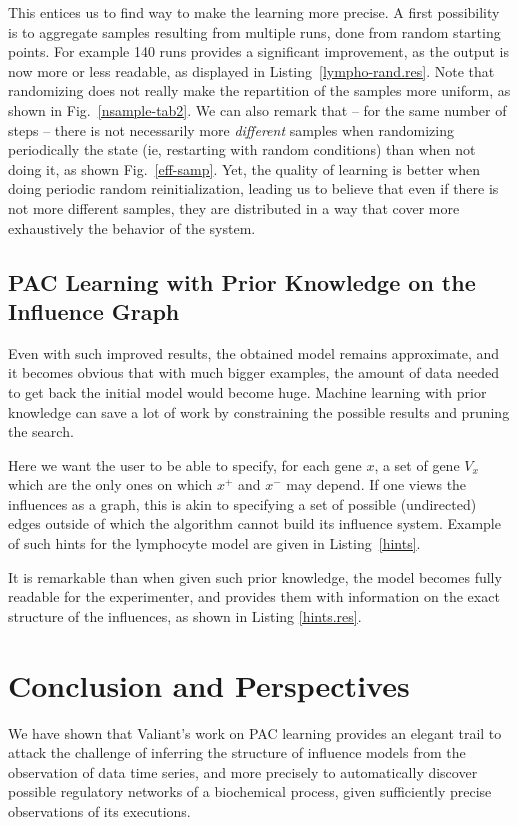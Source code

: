\documentclass{llncs}
\begin{document}
This entices us to find way to make the learning more precise. A first possibility is to aggregate samples resulting from multiple runs, done from random starting points. For example 140 runs provides a significant improvement, as the output is now more or less readable, as displayed in Listing~\ref{lympho-rand.res}. Note that randomizing does not really make the repartition of the samples more uniform, as shown in Fig.~\ref{nsample-tab2}. We can also remark that -- for the same number of steps -- there is not necessarily more \emph{different} samples when randomizing periodically the state (ie, restarting with random conditions) than when not doing it, as shown Fig.~\ref{eff-samp}. Yet, the quality of learning is better when doing periodic random reinitialization, leading us to believe that even if there is not more different samples, they are distributed in a way that cover more exhaustively the behavior of the system.
 
\subsection{PAC Learning with Prior Knowledge on the Influence Graph}

Even with such improved results, the obtained model remains approximate, and
it becomes obvious that with much bigger examples, the amount of data needed
to get back the initial model would become huge.
Machine learning with prior knowledge can save a lot of work by constraining the possible results and pruning the search.

Here we want the user to be able to specify, for each gene $x$, a set of gene $V_x$ which are the only ones on which $x^+$ and $x^-$ may depend. If one views the influences as a graph, this is akin to specifying a set of possible (undirected) edges outside of which the algorithm cannot build its influence system. Example of such hints for the lymphocyte model are given in Listing~\ref{hints}. 

It is remarkable than when given such prior knowledge, the model becomes fully readable for the experimenter, and provides them with information on the exact structure of the influences, as shown in Listing \ref{hints.res}.




\section{Conclusion and Perspectives}

We have shown that Valiant's work on PAC learning provides an elegant trail 
to attack the challenge of inferring the structure of influence models from the observation of data time series,
and more precisely to automatically discover possible regulatory networks of a biochemical process, given sufficiently precise observations of its executions.
\end{document}
